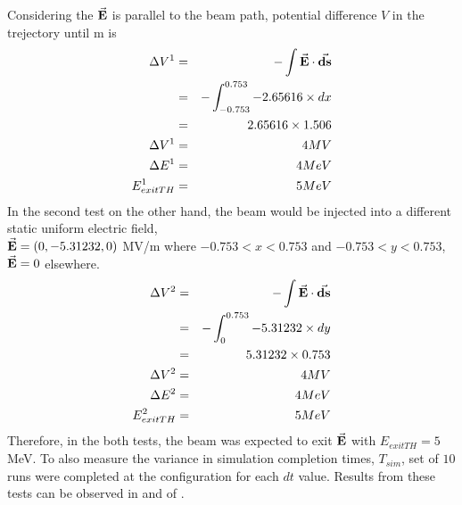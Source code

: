\documentclass{book}
\begin{document}
Considering the $\vec{\textbf{E}}$ is parallel to the beam path, potential difference $V$ in the trejectory until m is
\begin{eqnarray}
    \Delta V^1 &=& - \int \vec{\textbf{E}} \cdot \vec{\textbf{ds}} \\
             &=& - \int_{-0.753}^{0.753} -2.65616 \times dx \\
             &=& 2.65616 \times 1.506 \\
    \Delta V^1 &=& 4 MV \\
    \Delta E^1 &=& 4 MeV \\
    E_{exitTH}^1 &=& 5 MeV
\end{eqnarray}
In the second test on the other hand, the beam would be injected into a different static uniform electric field, \\
$\vec{\textbf{E}}=(0, -5.31232, 0)$ MV/m where $-0.753<x<0.753$ and $-0.753<y<0.753$, $\vec{\textbf{E}}=0$ elsewhere.
\begin{eqnarray}
    \Delta V^2   &=& - \int \vec{\textbf{E}} \cdot \vec{\textbf{ds}} \\
                 &=& - \int_{0}^{0.753} -5.31232 \times dy \\
                 &=& 5.31232 \times 0.753 \\
    \Delta V^2   &=& 4 MV \\
    \Delta E^2   &=& 4 MeV \\
    E_{exitTH}^2 &=& 5 MeV
\end{eqnarray}
Therefore, in the both tests, the beam was expected to exit $\vec{\textbf{E}}$ with $E_{exitTH} = 5$ MeV. 
To also measure the variance in simulation completion times, $T_{sim}$, set of $10$ runs were completed at the configuration for each $dt$ value.
Results from these tests can be observed in  and  of .
\end{document}
